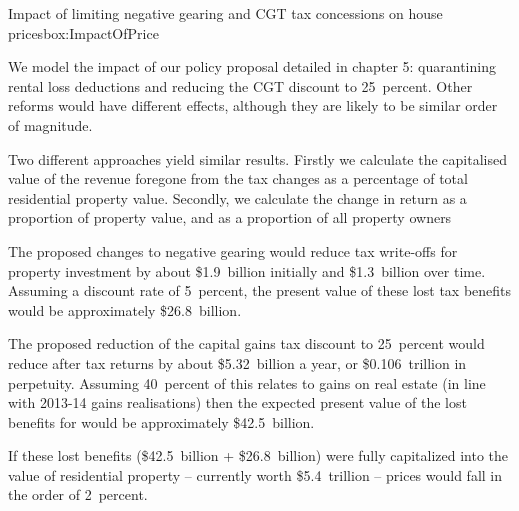 \documentclass{grattan}\usepackage[]{graphicx}\usepackage[]{color}
\begin{document}
\begin{bigbox*}{Impact of limiting negative gearing {and CGT} tax concessions on house prices}{box:ImpactOfPrice}

We model the impact of our policy proposal detailed in chapter 5: quarantining rental loss deductions and reducing the CGT discount to 25~percent. Other reforms would have different effects, although they are likely to be similar order of magnitude.

Two different approaches yield similar results. Firstly we calculate the capitalised value of the revenue foregone from the tax changes as a percentage of total residential property value. Secondly, we calculate the change in return as a proportion of property value, and as a proportion of all property owners



The proposed changes to negative gearing would reduce tax write-offs for property investment by about \$1.9~billion initially and \$1.3~billion over time. Assuming a discount rate of 
5~percent, the present value of these lost tax benefits would be approximately \$26.8~billion.


The proposed reduction of the capital gains tax discount to 25~percent would reduce after tax returns by about \$5.32~billion a year, or \$0.106~trillion in perpetuity. Assuming 40~percent of this relates to gains on real estate (in line with 2013-14 gains realisations) then the expected present value of the lost benefits for would be approximately \$42.5~billion.



If these lost benefits (\$42.5~billion + \$26.8~billion) were fully capitalized into the value of residential property -- currently worth \$5.4~trillion -- prices would fall in the order of 2~percent.

\eject
{}
\begin{table}[H]
\caption{Impact of policy changes on after-tax returns}\label{tbl:Impact-house-prices}
\end{table}
\end{bigbox*}
\end{document}
